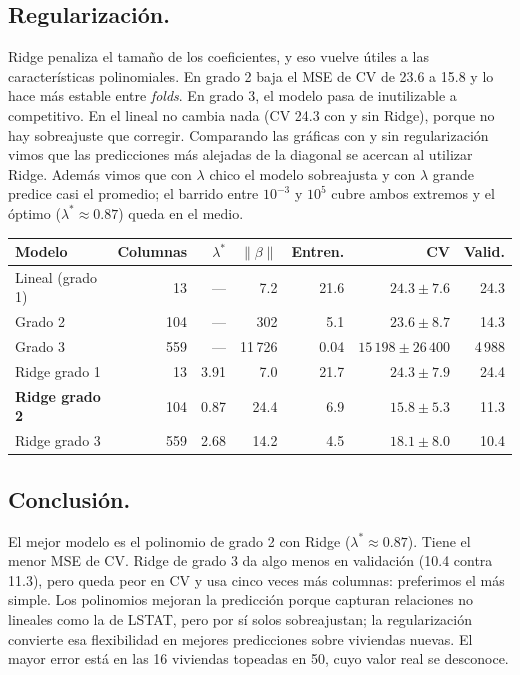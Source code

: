 \documentclass[10pt,a4paper]{article}
\begin{document}
\subsection{Regularización.}
Ridge penaliza el tamaño de los coeficientes, y eso vuelve útiles a las características polinomiales. En grado 2 baja el MSE de CV de 23.6 a 15.8 y lo hace más estable entre \emph{folds}. En grado 3, el modelo pasa de inutilizable a competitivo. En el lineal no cambia nada (CV 24.3 con y sin Ridge), porque no hay sobreajuste que corregir. Comparando las gráficas con y sin regularización vimos que las predicciones más alejadas de la diagonal se acercan al utilizar Ridge. Además vimos que con $\lambda$ chico el modelo sobreajusta y con $\lambda$ grande predice casi el promedio; el barrido entre $10^{-3}$ y $10^{5}$ cubre ambos extremos y el óptimo ($\lambda^*\approx 0.87$) queda en el medio. 
\begin{center}
\small
{}
\label{tab:p2}
\begin{tabular}{lrrrrrr}
  \toprule
  Modelo & Columnas & $\lambda^*$ & $\lVert\beta\rVert$ & Entren. & CV & Valid.\\
  \midrule
  Lineal (grado 1)       & 13  & ---  & 7.2     & 21.6 & $24.3 \pm 7.6$ & 24.3  \\
  Grado 2                & 104 & ---  & 302     & 5.1  & $23.6 \pm 8.7$ & 14.3 \\
  Grado 3                & 559 & ---  & 11\,726 & 0.04 & $15\,198 \pm 26\,400$ & 4\,988 \\
  \midrule
  Ridge grado 1          & 13  & 3.91 & 7.0     & 21.7 & $24.3 \pm 7.9$ & 24.4 \\
  \textbf{Ridge grado 2} & 104 & 0.87 & 24.4    & 6.9  & $\mathbf{15.8 \pm 5.3}$ & 11.3 \\
  Ridge grado 3          & 559 & 2.68 & 14.2    & 4.5  & $18.1 \pm 8.0$ & 10.4 \\
  \bottomrule
\end{tabular}
\end{center}
 
\subsection{Conclusión.}
El mejor modelo es el polinomio de grado 2 con Ridge ($\lambda^*\approx 0.87$). Tiene el menor MSE de CV. Ridge de grado 3 da algo menos en validación (10.4 contra 11.3), pero queda peor en CV y usa cinco veces más columnas: preferimos el más simple. Los polinomios mejoran la predicción porque capturan relaciones no lineales como la de LSTAT, pero por sí solos sobreajustan; la regularización convierte esa flexibilidad en mejores predicciones sobre viviendas nuevas. El mayor error está en las 16 viviendas topeadas en 50, cuyo valor real se desconoce. 
\end{document}
